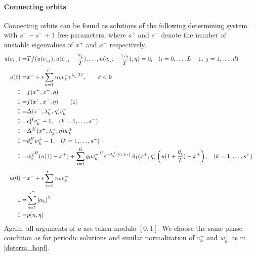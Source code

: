 \documentclass[10pt]{scrartcl}
\newcommand\numberthis{\addtocounter{equation}{1}\tag{\theequation}}
\begin{document}
{\paragraph{Connecting orbits}
Connecting orbits can be found as solutions of the following
determining system with $s^+-s^-+1$ free parameters, where $s^+$ and
$s^-$ denote the number of unstable eigenvalues of $x^+$ and $x^-$
respectively.
{\allowdisplaybreaks
\begin{align*}
  \dot{u}(c_{i,j})=& Tf(u(c_{i,j}),u(c_{i,j}-\frac{\tau_1}{T}),\ldots,
  u(c_{i,j}-\frac{\tau_m}{T}),\eta)=0\mbox{,\quad}(i=0,\ldots,L-1,\ j=1,\ldots,d) \\
  u(\tilde{c})=&x^{-}+\epsilon
  \sum_{k=1}^{s^{-}}\alpha_{k}v_{k}^{-}e^{\lambda_{k}^{-}T\tilde{c}}, \qquad \tilde{c}<0\\
  0=&f(x^{-},x^{-},\eta)\\
  0=&f(x^{+},x^{+},\eta)\numberthis\label{determ_hcli}\\
  0=&\Delta(x^{-},\lambda_k^-,\eta) v_{k}^{-} \\
  0=&c_k^{H}v_{k}^{-}-1\mbox{,\quad} (k=1,\ldots,s^{-})\\
  0=&\Delta^{H}(x^{+},\lambda_k^+,\eta)w_{k}^{+} \\
  0=&d_k^{H}w_{k}^{+}-1\mbox{,\quad} (k=1,\ldots,s^{+})\\
  0=&{w_{k}^{2}}^{H}(u(1)-x^{+})+\sum_{i=1}^{G}g_i{w_{k}^{+}}^{H}e^{-\lambda_{k}^{+}
    (\theta_i+\tau)}A_{1}(x^{+},\eta)
  \left(u(1+\frac{\theta_i}{T})-x^{+}\right)\mbox{,\quad}(k=1,\ldots,s^+)\\
  u(0)=&x^{-}+\epsilon\sum_{i=1}^{s^{-}}\alpha_{k}v_{k}^{-}\\
  1=&\sum_{i=1}^{s^-}|\alpha_{k}|^{2}\\
  0=&p(u,\eta)
\end{align*}
}Again, all arguments of $u$ are taken modulo $[0,1]$. We choose the
same phase condition as for periodic solutions and similar
normalization of $v_k^-$ and $w_k^+$ as in \eqref{determ_hopf}.

}
\end{document}
